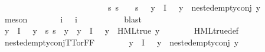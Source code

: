 \begin{isabellebody}
\ \ \ \ \ \ \ \ \ \ \ \ \ \ \ \ \ \ \ \ \ \ \ \ \ \ {\isachardoublequoteopen}{\isacharparenleft}{\kern0pt}{\isasymforall}s{\isachardot}{\kern0pt}\ {\isacharparenleft}{\kern0pt}s\ {\isasymTurnstile}\ {\isasymphi}{\isacharparenright}{\kern0pt}\ {\isacharequal}{\kern0pt}\ {\isacharparenleft}{\kern0pt}s\ {\isasymTurnstile}\ {\isasympsi}{\isacharparenright}{\kern0pt}{\isacharparenright}{\kern0pt}{\isachardoublequoteclose}\ {\isachardoublequoteopen}{\isacharparenleft}{\kern0pt}{\isasymforall}y{\isasymin}{\isasymPhi}\ {\isacharbackquote}{\kern0pt}\ I{\isachardot}{\kern0pt}\ {\isasymphi}\ {\isasymnoteq}\ y\ {\isasymlongrightarrow}\ nested{\isacharunderscore}{\kern0pt}empty{\isacharunderscore}{\kern0pt}conj\ y{\isacharparenright}{\kern0pt}{\isachardoublequoteclose}\isanewline
\ \ \ \ \ \ \isamarkupfalse%
\ meson\isanewline
\ \ \ \ \isamarkupfalse%
\ \isamarkupfalse%
\ i{\isacharunderscore}{\kern0pt}{\isasymphi}\ \ {\isachardoublequoteopen}{\isasymPhi}\ i{\isacharunderscore}{\kern0pt}{\isasymphi}\ {\isacharequal}{\kern0pt}\ {\isasymphi}{\isachardoublequoteclose}\ \isanewline
\ \ \ \ \ \ \isamarkupfalse%
\ blast\isanewline
\ \ \ \ \isamarkupfalse%
\ {\isachardoublequoteopen}{\isasymexists}y\ {\isasymin}\ {\isasymPhi}{\isacharbackquote}{\kern0pt}I{\isachardot}{\kern0pt}\ {\isasymphi}\ {\isasymnoteq}\ y\ {\isasymand}\ {\isacharparenleft}{\kern0pt}{\isasymforall}s{\isachardot}{\kern0pt}\ {\isasymnot}{\isacharparenleft}{\kern0pt}s\ {\isasymTurnstile}\ y{\isacharparenright}{\kern0pt}{\isacharparenright}{\kern0pt}{\isachardoublequoteclose}\ {\isacharbar}{\kern0pt}\ {\isachardoublequoteopen}{\isacharparenleft}{\kern0pt}{\isasymforall}y{\isasymin}{\isasymPhi}\ {\isacharbackquote}{\kern0pt}\ I{\isachardot}{\kern0pt}\ {\isasymphi}\ {\isasymnoteq}\ y\ {\isasymlongrightarrow}\ HML{\isacharunderscore}{\kern0pt}true\ y{\isacharparenright}{\kern0pt}{\isachardoublequoteclose}\isanewline
\ \ \ \ \ \ \isamarkupfalse%
\ HML{\isacharunderscore}{\kern0pt}true{\isacharunderscore}{\kern0pt}def\isanewline
\ \ \ \ \ \ \isamarkupfalse%
\ nested{\isacharunderscore}{\kern0pt}empty{\isacharunderscore}{\kern0pt}conj{\isacharunderscore}{\kern0pt}TT{\isacharunderscore}{\kern0pt}or{\isacharunderscore}{\kern0pt}FF\isanewline
\ \ \ \ \ \ \isamarkupfalse%
\ {\isacartoucheopen}{\isasymforall}y{\isasymin}{\isasymPhi}\ {\isacharbackquote}{\kern0pt}\ I{\isachardot}{\kern0pt}\ {\isasymphi}\ {\isasymnoteq}\ y\ {\isasymlongrightarrow}\ nested{\isacharunderscore}{\kern0pt}empty{\isacharunderscore}{\kern0pt}conj\ y{\isacartoucheclose}\ \isamarkupfalse%

\end{isabellebody}
